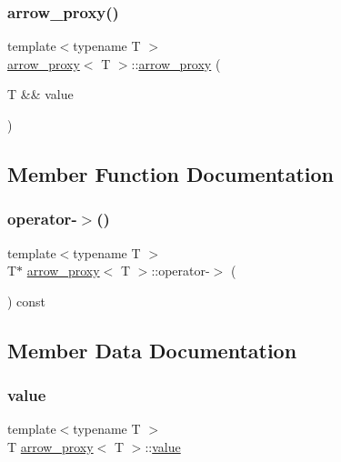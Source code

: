 \subsubsection{\texorpdfstring{arrow\_proxy()}{arrow\_proxy()}}
{\footnotesize\ttfamily template$<$typename T $>$ \\
\mbox{\hyperlink{structarrow__proxy}{arrow\+\_\+proxy}}$<$ T $>$\+::\mbox{\hyperlink{structarrow__proxy}{arrow\+\_\+proxy}} (\begin{DoxyParamCaption}\item[{T \&\&}]{value }\end{DoxyParamCaption})\hspace{0.3cm}{\ttfamily [inline]}}



\subsection{Member Function Documentation}
\mbox{\label{structarrow__proxy_aa4af1438adb54bcc3dbf89be8d3e8989}} 
\subsubsection{\texorpdfstring{operator-\/$>$()}{operator->()}}
{\footnotesize\ttfamily template$<$typename T $>$ \\
T$\ast$ \mbox{\hyperlink{structarrow__proxy}{arrow\+\_\+proxy}}$<$ T $>$\+::operator-\/$>$ (\begin{DoxyParamCaption}{ }\end{DoxyParamCaption}) const\hspace{0.3cm}{\ttfamily [inline]}}



\subsection{Member Data Documentation}
\mbox{\label{structarrow__proxy_a710c1d70612055324d70d539eadaaf9d}} 
\subsubsection{\texorpdfstring{value}{value}}
{\footnotesize\ttfamily template$<$typename T $>$ \\
T \mbox{\hyperlink{structarrow__proxy}{arrow\+\_\+proxy}}$<$ T $>$\+::\mbox{\hyperlink{_s_d_l__opengl__glext_8h_a8ad81492d410ff2ac11f754f4042150f}{value}}}



